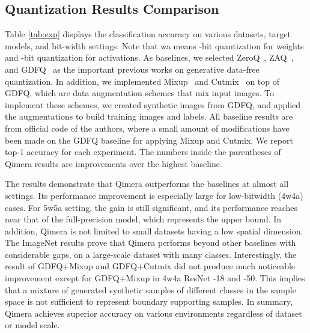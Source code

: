 \documentclass{article}
\newcommand{\aname}{Qimera\xspace}
\newcommand{\JL}[1]{{\color{magenta}[\textbf{\sc JLee}: \textit{#1}]}}
\renewcommand{\JL}[1]{}
\begin{document}
\subsection{Quantization Results Comparison}



Table \ref{tab:exp} displays the classification accuracy on various datasets, target models, and bit-width settings. 
Note that wa means -bit quantization for weights and -bit quantization for activations. 
As baselines, we selected ZeroQ~\cite{zeroq}, ZAQ~\cite{zaq}, and GDFQ~\cite{gdfq} as the important previous works on generative data-free quantization.
In addition, we implemented Mixup~\cite{mixup} and Cutmix~\cite{cutmix} on top of GDFQ, 
which are data augmentation schemes that mix input images.
To implement these schemes, we created synthetic images from GDFQ, and applied the augmentations to build training images and labels.
All baseline results are from official code of the authors, where a small amount of modifications have been made on the GDFQ baseline for applying Mixup and Cutmix.  
We report top-1 accuracy for each experiment.
The numbers inside the parentheses of \aname results are improvements over the highest baseline.

\JL{recheck below later for updated numbers}
The results demonstrate that \aname outperforms the baselines at almost all settings. 
Its performance improvement is especially large for low-bitwidth (4w4a) cases. For 5w5a setting, the gain is still significant, and its performance reaches near that of the full-precision model,
which represents the upper bound.  
In addition, \aname is not limited to small datasets having a low spatial dimension. 
The ImageNet results prove that \aname performs beyond other baselines with considerable gaps, on a large-scale dataset with many classes.  
Interestingly, the result of GDFQ+Mixup and GDFQ+Cutmix did not produce much noticeable improvement except for GDFQ+Mixup in 4w4a ResNet -18 and -50. 
This implies that a mixture of generated synthetic samples of different classes in the sample space is not sufficient to represent boundary supporting samples.
In summary, \aname achieves superior accuracy on various environments regardless of dataset or model scale.  
\end{document}
